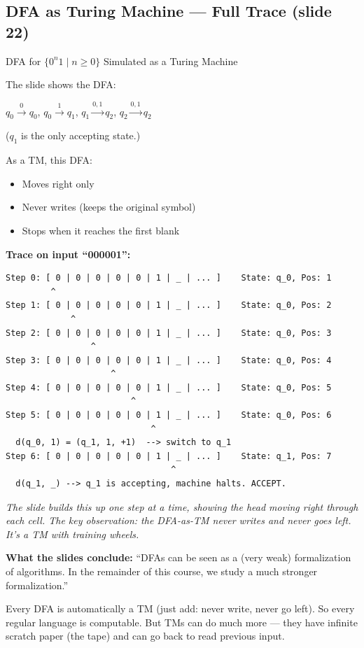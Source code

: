 \documentclass[11pt,a4paper]{article}
\newcommand{\kt}[1]{\par\vspace{0.3em}\colorbox{yellow!60}{\parbox{\dimexpr\linewidth-2\fboxsep}{#1}}\vspace{0.3em}}
\begin{document}
\subsection{DFA as Turing Machine --- Full Trace (slide 22)}

\begin{examplebox}{DFA for $\{0^n 1 \mid n \geq 0\}$ Simulated as a Turing Machine}

The slide shows the DFA:
\begin{center}
$q_0 \xrightarrow{0} q_0$, \quad $q_0 \xrightarrow{1} q_1$, \quad $q_1 \xrightarrow{0,1} q_2$, \quad $q_2 \xrightarrow{0,1} q_2$
\end{center}
($q_1$ is the only accepting state.)

As a TM, this DFA:
\begin{itemize}[nosep]
\item Moves right only
\item Never writes (keeps the original symbol)
\item Stops when it reaches the first blank
\end{itemize}

\textbf{Trace on input ``000001'':}

\begin{lstlisting}
Step 0: [ 0 | 0 | 0 | 0 | 0 | 1 | _ | ... ]    State: q_0, Pos: 1
         ^
Step 1: [ 0 | 0 | 0 | 0 | 0 | 1 | _ | ... ]    State: q_0, Pos: 2
             ^
Step 2: [ 0 | 0 | 0 | 0 | 0 | 1 | _ | ... ]    State: q_0, Pos: 3
                 ^
Step 3: [ 0 | 0 | 0 | 0 | 0 | 1 | _ | ... ]    State: q_0, Pos: 4
                     ^
Step 4: [ 0 | 0 | 0 | 0 | 0 | 1 | _ | ... ]    State: q_0, Pos: 5
                         ^
Step 5: [ 0 | 0 | 0 | 0 | 0 | 1 | _ | ... ]    State: q_0, Pos: 6
                             ^
  d(q_0, 1) = (q_1, 1, +1)  --> switch to q_1
Step 6: [ 0 | 0 | 0 | 0 | 0 | 1 | _ | ... ]    State: q_1, Pos: 7
                                 ^
  d(q_1, _) --> q_1 is accepting, machine halts. ACCEPT.
\end{lstlisting}

\textit{The slide builds this up one step at a time, showing the head moving right through each cell. The key observation: the DFA-as-TM never writes and never goes left. It's a TM with training wheels.}

\textbf{What the slides conclude:} ``DFAs can be seen as a (very weak) formalization of algorithms. In the remainder of this course, we study a much stronger formalization.''

\kt{Every DFA is automatically a TM (just add: never write, never go left). So every regular language is computable. But TMs can do much more --- they have infinite scratch paper (the tape) and can go back to read previous input.}
\end{examplebox}
\end{document}
